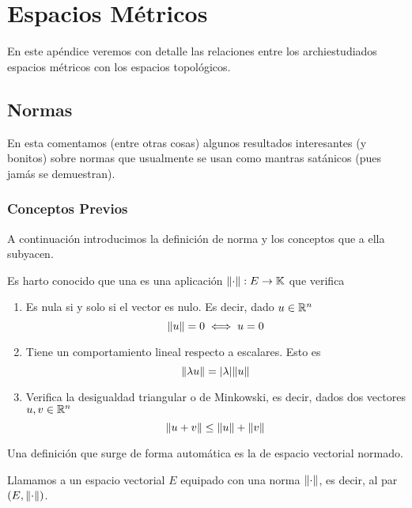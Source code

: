 \chapter{Espacios Métricos}
\label{met}
En este apéndice veremos con detalle las relaciones entre los archiestudiados espacios métricos con los espacios topológicos.
\section{Normas}
En esta comentamos (entre otras cosas) algunos resultados interesantes (y bonitos) sobre normas que usualmente se usan como mantras satánicos (pues jamás se demuestran).
\subsection{Conceptos Previos}
A continuación introducimos la definición de norma y los conceptos que a ella subyacen.
\begin{defi}[Norma]
	Es harto conocido que una  es una aplicación $\lVert\cdot\rVert:E\to\mathbb{K}$ que verifica
	\begin{enumerate}
		\item \label{norma_vector_nulo} Es nula si y solo si el vector es nulo. Es decir, dado $u\in\mathbb{R}^n$
		\begin{equation*}
			\lVert u\rVert=0\iff u=0
		\end{equation*}
		\item \label{norma_lambda} Tiene un comportamiento lineal respecto a escalares. Esto es
		\begin{equation*}
		\lVert\lambda u\rVert=\lvert\lambda\rvert\lVert u\rVert
		\end{equation*}	
		\item \label{norma_triangular} Verifica la desigualdad triangular o de Minkowski, es decir, dados dos vectores $u,v\in\mathbb{R}^n$
		\begin{equation*}
		\lVert u+v\rVert\le \lVert u\rVert+\lVert v\rVert
		\end{equation*}
	\end{enumerate}
\end{defi}
Una definición que surge de forma automática es la de espacio vectorial normado.
\begin{defi}
	Llamamos  a un espacio vectorial $E$ equipado con una norma $\lVert\cdot\rVert$, es decir, al par $(E,\lVert\cdot\rVert)$.
\end{defi}

